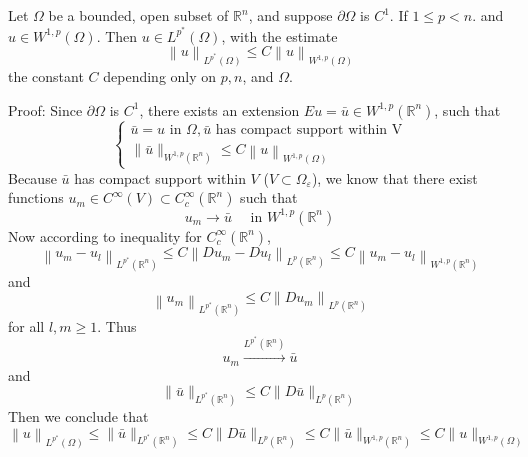 \begin{theorem}
    Let $\Omega$ be a bounded, open subset of $\mathbb{R}^n$, and suppose $\partial \Omega$ is $C^1$.
    If $1 \leq p<n$. and $u \in W^{1, p}\left(\Omega\right)$.
    Then $u \in L^{p^*}\left(\Omega\right)$, with the estimate
    \begin{equation*}
        \left\|u\right\|_{L^{p^*}\left(\Omega\right)} \leq C\left\|u\right\|_{W^{1, p}\left(\Omega\right)}
    \end{equation*}
    the constant $C$ depending only on $p, n$, and $\Omega$.

    Proof:
    Since $\partial \Omega$ is $C^1$, there exists an extension $E u=\bar{u} \in W^{1, p}\left(\mathbb{R}^n\right)$, such that
    \begin{equation*}
        \left\{\begin{array}{l}
            \bar{u}=u \text { in } \Omega, \bar{u} \text { has compact support within V} \\
            \|\bar{u}\|_{W^{1, p}\left(\mathbb{R}^n\right)} \leq C\left\|u\right\|_{W^{1, p}\left(\Omega\right)}
        \end{array}\right.
    \end{equation*}
    Because $\bar{u}$ has compact support within $V$ ($V \subset \Omega_\varepsilon$), we know that there exist functions $u_m \in C^\infty(V) \subset C_c^{\infty}\left(\mathbb{R}^n\right)$ such that
    $$
        u_m \rightarrow \bar{u} \quad \text { in } W^{1, p}\left(\mathbb{R}^n\right)
    $$
    Now according to inequality for $C^\infty_c(\mathbb{R}^n)$,
    \begin{equation*}
        \left\|u_m-u_l\right\|_{L^{p^*}\left(\mathbb{R}^n\right)}
        \leq
        C\left\|D u_m-D u_l\right\|_{L^p\left(\mathbb{R}^n\right)}
        \leq
        C\left\| u_m- u_l\right\|_{W^{1, p}\left(\mathbb{R}^n\right)}
    \end{equation*}
    and
    \begin{equation*}
        \left\|u_m\right\|_{L^{p^*}\left(\mathbb{R}^n\right)} \leq C\left\|D u_m\right\|_{L^p\left(\mathbb{R}^n\right)}
    \end{equation*}
    for all $l, m \geq 1$. Thus
    \begin{equation*}
        u_m \xrightarrow{L^{p^*}(\mathbb{R}^n)} \bar{u}
    \end{equation*}
    and
    \begin{equation*}
        \|\bar{u}\|_{L^{p^*}\left(\mathbb{R}^n\right)} \leq C\|D \bar{u}\|_{L^p\left(\mathbb{R}^n\right)}
    \end{equation*}
    Then we conclude that
    \begin{equation*}
        \left\|u\right\|_{L^{p^*}\left(\Omega\right)}
        \leq \|\bar{u}\|_{L^{p^*}\left(\mathbb{R}^n\right)}
        \leq C\|D \bar{u}\|_{L^p\left(\mathbb{R}^n\right)}
        \leq C\| \bar{u}\|_{W^{1,p}\left(\mathbb{R}^n\right)}
        \leq C\| u\|_{W^{1,p}\left(\Omega\right)}
    \end{equation*}
\end{theorem}

